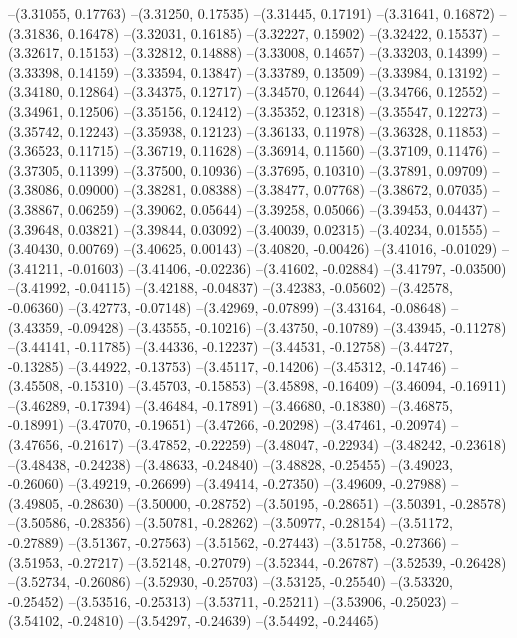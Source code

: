 --(3.31055, 0.17763)
--(3.31250, 0.17535)
--(3.31445, 0.17191)
--(3.31641, 0.16872)
--(3.31836, 0.16478)
--(3.32031, 0.16185)
--(3.32227, 0.15902)
--(3.32422, 0.15537)
--(3.32617, 0.15153)
--(3.32812, 0.14888)
--(3.33008, 0.14657)
--(3.33203, 0.14399)
--(3.33398, 0.14159)
--(3.33594, 0.13847)
--(3.33789, 0.13509)
--(3.33984, 0.13192)
--(3.34180, 0.12864)
--(3.34375, 0.12717)
--(3.34570, 0.12644)
--(3.34766, 0.12552)
--(3.34961, 0.12506)
--(3.35156, 0.12412)
--(3.35352, 0.12318)
--(3.35547, 0.12273)
--(3.35742, 0.12243)
--(3.35938, 0.12123)
--(3.36133, 0.11978)
--(3.36328, 0.11853)
--(3.36523, 0.11715)
--(3.36719, 0.11628)
--(3.36914, 0.11560)
--(3.37109, 0.11476)
--(3.37305, 0.11399)
--(3.37500, 0.10936)
--(3.37695, 0.10310)
--(3.37891, 0.09709)
--(3.38086, 0.09000)
--(3.38281, 0.08388)
--(3.38477, 0.07768)
--(3.38672, 0.07035)
--(3.38867, 0.06259)
--(3.39062, 0.05644)
--(3.39258, 0.05066)
--(3.39453, 0.04437)
--(3.39648, 0.03821)
--(3.39844, 0.03092)
--(3.40039, 0.02315)
--(3.40234, 0.01555)
--(3.40430, 0.00769)
--(3.40625, 0.00143)
--(3.40820, -0.00426)
--(3.41016, -0.01029)
--(3.41211, -0.01603)
--(3.41406, -0.02236)
--(3.41602, -0.02884)
--(3.41797, -0.03500)
--(3.41992, -0.04115)
--(3.42188, -0.04837)
--(3.42383, -0.05602)
--(3.42578, -0.06360)
--(3.42773, -0.07148)
--(3.42969, -0.07899)
--(3.43164, -0.08648)
--(3.43359, -0.09428)
--(3.43555, -0.10216)
--(3.43750, -0.10789)
--(3.43945, -0.11278)
--(3.44141, -0.11785)
--(3.44336, -0.12237)
--(3.44531, -0.12758)
--(3.44727, -0.13285)
--(3.44922, -0.13753)
--(3.45117, -0.14206)
--(3.45312, -0.14746)
--(3.45508, -0.15310)
--(3.45703, -0.15853)
--(3.45898, -0.16409)
--(3.46094, -0.16911)
--(3.46289, -0.17394)
--(3.46484, -0.17891)
--(3.46680, -0.18380)
--(3.46875, -0.18991)
--(3.47070, -0.19651)
--(3.47266, -0.20298)
--(3.47461, -0.20974)
--(3.47656, -0.21617)
--(3.47852, -0.22259)
--(3.48047, -0.22934)
--(3.48242, -0.23618)
--(3.48438, -0.24238)
--(3.48633, -0.24840)
--(3.48828, -0.25455)
--(3.49023, -0.26060)
--(3.49219, -0.26699)
--(3.49414, -0.27350)
--(3.49609, -0.27988)
--(3.49805, -0.28630)
--(3.50000, -0.28752)
--(3.50195, -0.28651)
--(3.50391, -0.28578)
--(3.50586, -0.28356)
--(3.50781, -0.28262)
--(3.50977, -0.28154)
--(3.51172, -0.27889)
--(3.51367, -0.27563)
--(3.51562, -0.27443)
--(3.51758, -0.27366)
--(3.51953, -0.27217)
--(3.52148, -0.27079)
--(3.52344, -0.26787)
--(3.52539, -0.26428)
--(3.52734, -0.26086)
--(3.52930, -0.25703)
--(3.53125, -0.25540)
--(3.53320, -0.25452)
--(3.53516, -0.25313)
--(3.53711, -0.25211)
--(3.53906, -0.25023)
--(3.54102, -0.24810)
--(3.54297, -0.24639)
--(3.54492, -0.24465)
